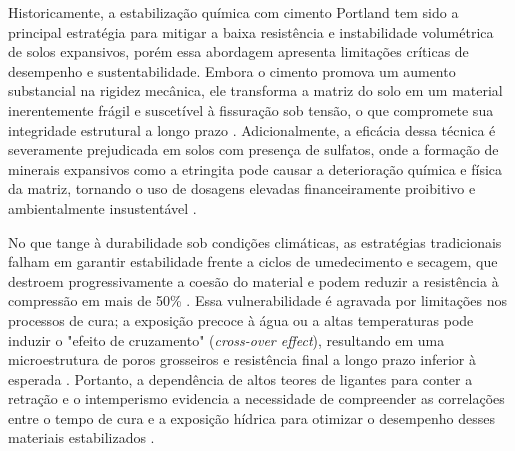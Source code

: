 

    Historicamente, a estabilização química com cimento Portland tem sido a principal estratégia para mitigar a baixa resistência e instabilidade volumétrica de solos expansivos, porém essa abordagem apresenta limitações críticas de desempenho e sustentabilidade. Embora o cimento promova um aumento substancial na rigidez mecânica, ele transforma a matriz do solo em um material inerentemente frágil e suscetível à fissuração sob tensão, o que compromete sua integridade estrutural a longo prazo \cite{Chen2024, Zhang2025, Lu2019}. Adicionalmente, a eficácia dessa técnica é severamente prejudicada em solos com presença de sulfatos, onde a formação de minerais expansivos como a etringita pode causar a deterioração química e física da matriz, tornando o uso de dosagens elevadas financeiramente proibitivo e ambientalmente insustentável \cite{Mahedi2018}.

    No que tange à durabilidade sob condições climáticas, as estratégias tradicionais falham em garantir estabilidade frente a ciclos de umedecimento e secagem, que destroem progressivamente a coesão do material e podem reduzir a resistência à compressão em mais de 50\% \cite{Chen2024, Hu2024}. Essa vulnerabilidade é agravada por limitações nos processos de cura; a exposição precoce à água ou a altas temperaturas pode induzir o "efeito de cruzamento" (\textit{cross-over effect}), resultando em uma microestrutura de poros grosseiros e resistência final a longo prazo inferior à esperada \cite{AlGburi2025, Wang2022, Lu2019}. Portanto, a dependência de altos teores de ligantes para conter a retração e o intemperismo evidencia a necessidade de compreender as correlações entre o tempo de cura e a exposição hídrica para otimizar o desempenho desses materiais estabilizados \cite{Zhang2025}.


